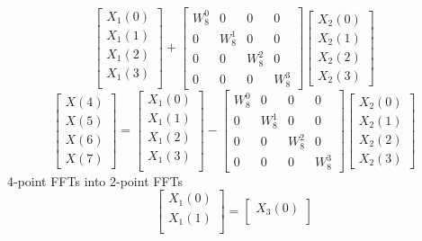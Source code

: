 \documentclass[journal,12pt,twocolumn]{IEEEtran}
\renewcommand\thesection{\arabic{section}}
\begin{document}
\begin{enumerate}[label=\arabic*.,ref=\thesection.\theenumi]
\begin{equation}
\begin{bmatrix}
X_{1}(0) \\ 
X_{1}(1)\\ 
X_{1}(2)\\
X_{1}(3)\\
\end{bmatrix}
+
\begin{bmatrix}
W^{0}_{8} & 0 & 0 & 0\\
0 & W^{1}_{8} & 0 & 0\\
0 & 0 & W^{2}_{8} & 0\\
0 & 0 & 0 & W^{3}_{8}
\end{bmatrix}
\begin{bmatrix}
X_{2}(0) \\ 
X_{2}(1) \\ 
X_{2}(2) \\
X_{2}(3)
\end{bmatrix}
\end{equation}
\begin{equation}
\begin{bmatrix}
X(4) \\ 
X(5) \\ 
X(6) \\ 
X(7)
\end{bmatrix}
=
\begin{bmatrix}
X_{1}(0) \\ 
X_{1}(1)\\ 
X_{1}(2)\\
X_{1}(3)\\
\end{bmatrix}
-
\begin{bmatrix}
W^{0}_{8} & 0 & 0 & 0\\
0 & W^{1}_{8} & 0 & 0\\
0 & 0 & W^{2}_{8} & 0\\
0 & 0 & 0 & W^{3}_{8}
\end{bmatrix}
\begin{bmatrix}
X_{2}(0) \\ 
X_{2}(1) \\ 
X_{2}(2) \\
X_{2}(3)
\end{bmatrix}
\end{equation}
4-point FFTs into 2-point FFTs
\begin{equation}
\begin{bmatrix}
X_{1}(0) \\ 
X_{1}(1)\\ 
\end{bmatrix}
=
\begin{bmatrix}
X_{3}(0) \\ 

\end{bmatrix}
\end{equation}
\end{enumerate}
\end{document}
